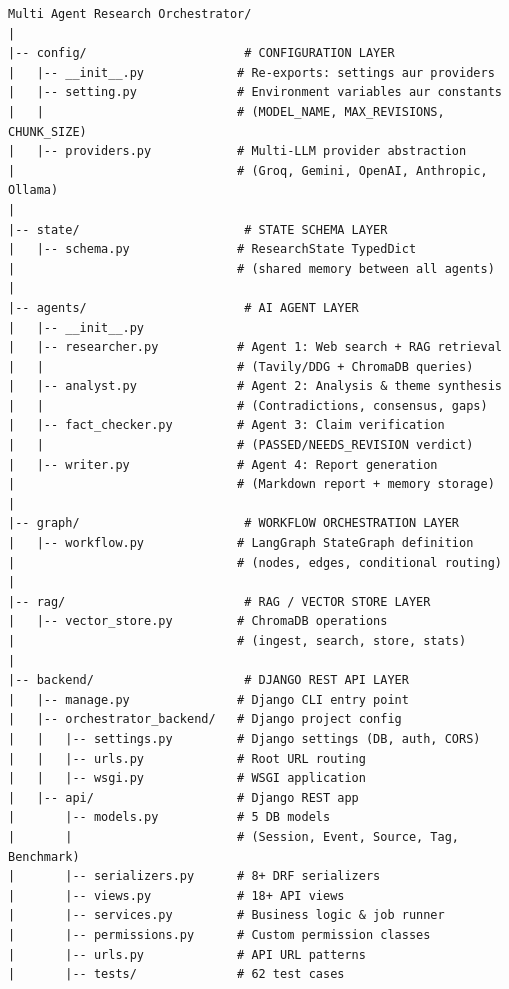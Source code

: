 \documentclass[11pt,a4paper,twoside]{report}
\begin{document}
\begin{lstlisting}[style=pythonstyle,caption={Complete Project Structure --- Har File Ka Purpose},language={}]
Multi Agent Research Orchestrator/
|
|-- config/                      # CONFIGURATION LAYER
|   |-- __init__.py             # Re-exports: settings aur providers
|   |-- setting.py              # Environment variables aur constants
|   |                           # (MODEL_NAME, MAX_REVISIONS, CHUNK_SIZE)
|   |-- providers.py            # Multi-LLM provider abstraction
|                               # (Groq, Gemini, OpenAI, Anthropic, Ollama)
|
|-- state/                       # STATE SCHEMA LAYER
|   |-- schema.py               # ResearchState TypedDict
|                               # (shared memory between all agents)
|
|-- agents/                      # AI AGENT LAYER
|   |-- __init__.py
|   |-- researcher.py           # Agent 1: Web search + RAG retrieval
|   |                           # (Tavily/DDG + ChromaDB queries)
|   |-- analyst.py              # Agent 2: Analysis & theme synthesis
|   |                           # (Contradictions, consensus, gaps)
|   |-- fact_checker.py         # Agent 3: Claim verification
|   |                           # (PASSED/NEEDS_REVISION verdict)
|   |-- writer.py               # Agent 4: Report generation
|                               # (Markdown report + memory storage)
|
|-- graph/                       # WORKFLOW ORCHESTRATION LAYER
|   |-- workflow.py             # LangGraph StateGraph definition
|                               # (nodes, edges, conditional routing)
|
|-- rag/                         # RAG / VECTOR STORE LAYER
|   |-- vector_store.py         # ChromaDB operations
|                               # (ingest, search, store, stats)
|
|-- backend/                     # DJANGO REST API LAYER
|   |-- manage.py               # Django CLI entry point
|   |-- orchestrator_backend/   # Django project config
|   |   |-- settings.py         # Django settings (DB, auth, CORS)
|   |   |-- urls.py             # Root URL routing
|   |   |-- wsgi.py             # WSGI application
|   |-- api/                    # Django REST app
|       |-- models.py           # 5 DB models
|       |                       # (Session, Event, Source, Tag, Benchmark)
|       |-- serializers.py      # 8+ DRF serializers
|       |-- views.py            # 18+ API views
|       |-- services.py         # Business logic & job runner
|       |-- permissions.py      # Custom permission classes
|       |-- urls.py             # API URL patterns
|       |-- tests/              # 62 test cases

\end{lstlisting}
\end{document}
